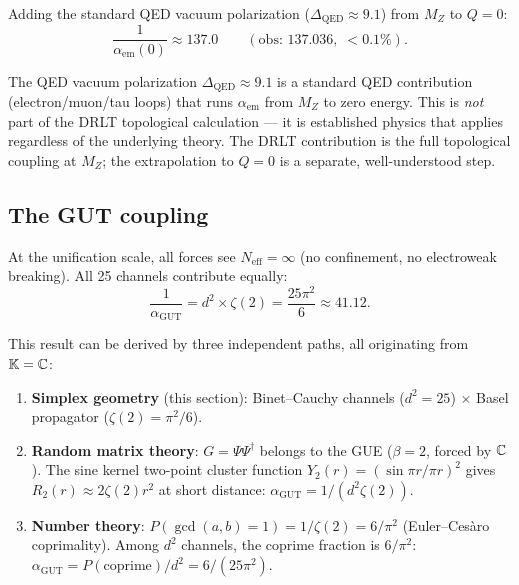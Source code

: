 Adding the standard QED vacuum polarization ($\Delta_\text{QED} \approx 9.1$) from $M_Z$ to $Q = 0$:
\begin{equation}
\frac{1}{\alpha_\text{em}(0)} \approx 137.0 \qquad (\text{obs: } 137.036,\; <0.1\%).
\end{equation}

\begin{remark}
The QED vacuum polarization $\Delta_\text{QED} \approx 9.1$ is a standard QED contribution (electron/muon/tau loops) that runs $\alpha_\text{em}$ from $M_Z$ to zero energy. This is \emph{not} part of the DRLT topological calculation --- it is established physics that applies regardless of the underlying theory. The DRLT contribution is the full topological coupling at $M_Z$; the extrapolation to $Q = 0$ is a separate, well-understood step.
\end{remark}

\subsection{The GUT coupling}

At the unification scale, all forces see $N_\text{eff} = \infty$ (no confinement, no electroweak breaking). All 25 channels contribute equally:
\begin{equation}
\boxed{\frac{1}{\alpha_\text{GUT}} = d^2 \times \zeta(2) = \frac{25\pi^2}{6} \approx 41.12.}
\end{equation}

This result can be derived by three independent paths, all originating from $\mathbb{K} = \mathbb{C}$:

\begin{enumerate}
\item \textbf{Simplex geometry} (this section): Binet--Cauchy channels ($d^2 = 25$) $\times$ Basel propagator ($\zeta(2) = \pi^2/6$).

\item \textbf{Random matrix theory}: $G = \Psi\Psi^\dagger$ belongs to the GUE ($\beta = 2$, forced by $\mathbb{C}$). The sine kernel two-point cluster function $Y_2(r) = (\sin\pi r/\pi r)^2$ gives $R_2(r) \approx 2\zeta(2)r^2$ at short distance: $\alpha_\text{GUT} = 1/(d^2 \zeta(2))$.

\item \textbf{Number theory}: $P(\gcd(a,b) = 1) = 1/\zeta(2) = 6/\pi^2$ (Euler--Ces\`aro coprimality). Among $d^2$ channels, the coprime fraction is $6/\pi^2$: $\alpha_\text{GUT} = P(\text{coprime})/d^2 = 6/(25\pi^2)$.
\end{enumerate}


